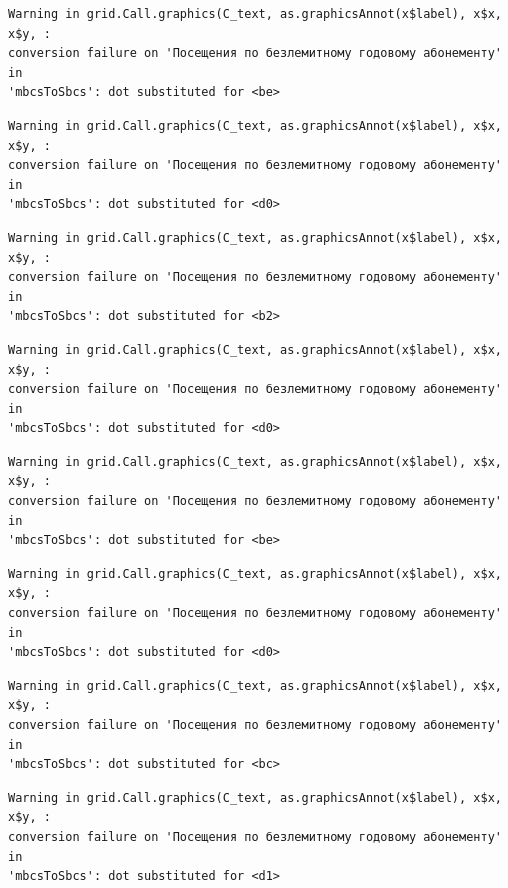 \documentclass[
  letterpaper,
  DIV=11,
  numbers=noendperiod]{scrartcl}
\begin{document}
\begin{verbatim}
Warning in grid.Call.graphics(C_text, as.graphicsAnnot(x$label), x$x, x$y, :
conversion failure on 'Посещения по безлемитному годовому абонементу' in
'mbcsToSbcs': dot substituted for <be>
\end{verbatim}

\begin{verbatim}
Warning in grid.Call.graphics(C_text, as.graphicsAnnot(x$label), x$x, x$y, :
conversion failure on 'Посещения по безлемитному годовому абонементу' in
'mbcsToSbcs': dot substituted for <d0>
\end{verbatim}

\begin{verbatim}
Warning in grid.Call.graphics(C_text, as.graphicsAnnot(x$label), x$x, x$y, :
conversion failure on 'Посещения по безлемитному годовому абонементу' in
'mbcsToSbcs': dot substituted for <b2>
\end{verbatim}

\begin{verbatim}
Warning in grid.Call.graphics(C_text, as.graphicsAnnot(x$label), x$x, x$y, :
conversion failure on 'Посещения по безлемитному годовому абонементу' in
'mbcsToSbcs': dot substituted for <d0>
\end{verbatim}

\begin{verbatim}
Warning in grid.Call.graphics(C_text, as.graphicsAnnot(x$label), x$x, x$y, :
conversion failure on 'Посещения по безлемитному годовому абонементу' in
'mbcsToSbcs': dot substituted for <be>
\end{verbatim}

\begin{verbatim}
Warning in grid.Call.graphics(C_text, as.graphicsAnnot(x$label), x$x, x$y, :
conversion failure on 'Посещения по безлемитному годовому абонементу' in
'mbcsToSbcs': dot substituted for <d0>
\end{verbatim}

\begin{verbatim}
Warning in grid.Call.graphics(C_text, as.graphicsAnnot(x$label), x$x, x$y, :
conversion failure on 'Посещения по безлемитному годовому абонементу' in
'mbcsToSbcs': dot substituted for <bc>
\end{verbatim}

\begin{verbatim}
Warning in grid.Call.graphics(C_text, as.graphicsAnnot(x$label), x$x, x$y, :
conversion failure on 'Посещения по безлемитному годовому абонементу' in
'mbcsToSbcs': dot substituted for <d1>
\end{verbatim}
\end{document}
